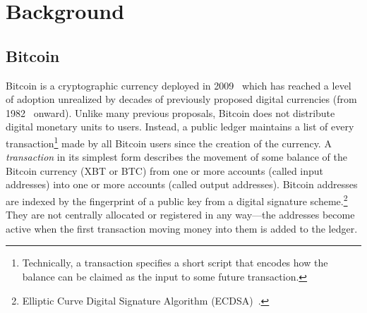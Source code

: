 


\section{Background}
\subsection{Bitcoin}
Bitcoin is a cryptographic currency deployed in 2009~\cite{Nak08} which has reached a level of adoption unrealized by decades of previously proposed digital currencies (from 1982~\cite{Cha82} onward). Unlike many previous proposals, Bitcoin does not distribute digital monetary units to users. Instead, a public ledger maintains a list of every transaction\footnote{Technically, a transaction specifies a short script that encodes how the balance can be claimed as the input to some future transaction.} made by all Bitcoin users since the creation of the currency. A \textit{transaction} in its simplest form describes the movement of some balance of the Bitcoin currency (XBT or BTC) from one or more accounts (called input addresses) into one or more accounts (called output addresses). Bitcoin addresses are indexed by the fingerprint of a public key from a digital signature scheme.\footnote{Elliptic Curve Digital Signature Algorithm (ECDSA)~\cite{ecdsa}.} They are not centrally allocated or registered in any way---the addresses become active when the first transaction moving money into them is added to the ledger. 

